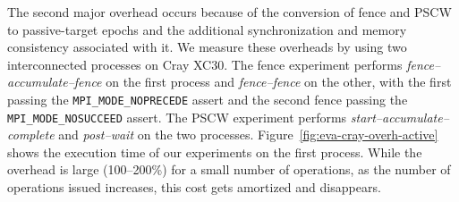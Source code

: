 The second major overhead occurs because of the conversion of fence and
PSCW to passive-target epochs and the additional synchronization and
memory consistency associated with it. We measure these overheads by
using two interconnected processes on Cray XC30.
The fence experiment performs \emph{fence--accumulate--fence} on the first
process and \emph{fence--fence} on the other, with the first passing
the \texttt{MPI\_MODE\_NOPRECEDE} assert and the second fence passing
the \texttt{MPI\_MODE\_NOSUCCEED} assert.  The PSCW experiment
performs \emph{start--accumulate--complete} and \emph{post--wait} on
the two processes. Figure~\ref{fig:eva-cray-overh-active} shows
the execution time of our experiments on the first process. While the
overhead is large (100--200\%) for a small number of operations, as the
number of operations issued increases, this cost gets amortized and disappears.


